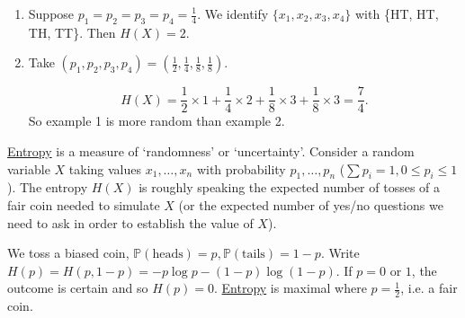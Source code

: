 \documentclass{article}
\newcommand{\Prob}{\mathbb{P}}
\newcommand{\1}[1]{\mathbbm{1}_{#1}}
\begin{document}
\begin{eg}
    \leavevmode
    \begin{enumerate}[label=\arabic*.]
        \item Suppose $p_1 = p_2 = p_3 = p_4 = \frac{1}{4}$. We identify $\{x_1, x_2, x_3, x_4\}$ with \{HT, HT, TH, TT\}. Then $H(X) = 2$.
        \item Take $(p_1, p_2, p_3, p_4) = (\frac{1}{2}, \frac{1}{4}, \frac{1}{8}, \frac{1}{8})$.
            \begin{center}
            \end{center}
            \begin{equation*}
                H(X) = \frac{1}{2} \times 1 + \frac{1}{4} \times 2 + \frac{1}{8} \times 3 + \frac{1}{8} \times 3 = \frac{7}{4}.
            \end{equation*}
            So example 1 is more random than example 2.
    \end{enumerate}
\end{eg}

\hyperlink{def:entropy}{Entropy} is a measure of `randomness' or `uncertainty'.
Consider a random variable $X$ taking values $x_1, \dotsc, x_n$ with probability $p_1, \dotsc, p_n$ ($\sum p_i = 1, 0 \leq p_i \leq 1$).
The entropy $H(X)$ is roughly speaking the expected number of tosses of a fair coin needed to simulate $X$ (or the expected number of yes/no questions we need to ask in order to establish the value of $X$).

\begin{eg}
    We toss a biased coin, $\Prob(\text{heads}) = p, \Prob(\text{tails}) = 1-p$. Write $H(p) = H(p, 1-p) = -p \log p - (1-p) \log (1-p)$.
    If $p=0$ or $1$, the outcome is certain and so $H(p)=0$. \hyperlink{def:entropy}{Entropy} is maximal where $p=\frac{1}{2}$, i.e. a fair coin.

    \begin{center}
    \end{center}
\end{eg}
\end{document}
